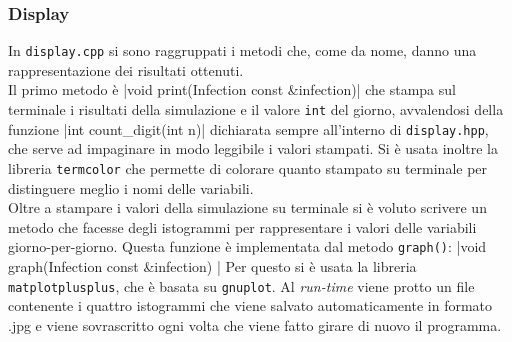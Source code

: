 \documentclass{article}
\begin{document}
{\subsubsection{Display}
In \verb|display.cpp| si sono raggruppati i metodi che, come da 
nome, danno una rappresentazione dei risultati ottenuti.\\
Il primo metodo è 
|void print(Infection const &infection){|
che stampa sul terminale i risultati della simulazione e il valore 
\verb|int| del giorno, avvalendosi della funzione 
|int count_digit(int n){|
dichiarata sempre all'interno di \verb|display.hpp|, che serve ad 
impaginare in modo leggibile i valori stampati.
Si è usata inoltre la libreria \verb|termcolor| che permette di 
colorare quanto stampato su terminale per distinguere meglio
i nomi delle variabili. \\
Oltre a stampare i valori della simulazione su terminale si è voluto
scrivere un metodo che facesse degli istogrammi per rappresentare i
valori delle variabili giorno-per-giorno.
Questa funzione è implementata dal metodo \verb|graph()|:
|void graph(Infection const &infection) {|
Per questo si è usata la libreria \verb|matplotplusplus|, che è 
basata su \verb|gnuplot|. Al \textit{run-time} viene protto un 
file contenente i quattro istogrammi che viene salvato 
automaticamente in formato .jpg e viene sovrascritto ogni volta che
viene fatto girare di nuovo il programma.
}}}}
\end{document}
